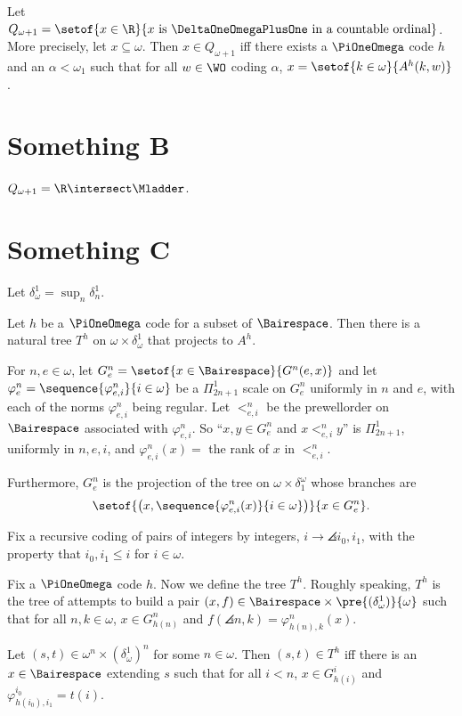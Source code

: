 \documentclass[oneside,12pt]{amsart}
\begin{document}
\begin{definition}
Let $Q_{\omega+1} = \setof{x\in\R}{x\text{ is }\DeltaOneOmegaPlusOne\text{ in a countable ordinal}}$. More precisely,
let $x\subseteq\omega$. Then $x\in Q_{\omega+1}$ iff there exists a $\PiOneOmega$ code $h$ and an $\alpha<\omega_1$ such that
for all $w\in\WO$ coding $\alpha$, $x=\setof{k\in\omega}{A^h(k,w)}$.
\end{definition}

\section{Something B}
\label{section:somethingb}
\begin{theorem}
$Q_{\omega+1} = \R \intersect \Mladder$.
\end{theorem}

\section{Something C}
\label{section:somethingac}

Let $\delta^1_{\omega} = \sup_n \delta^1_n$.

\begin{definition}
Let $h$ be a $\PiOneOmega$ code for a subset of $\Bairespace$.
Then there is a natural tree $T^{h}$ on $\omega\times\delta^1_{\omega}$ that projects to $A^h$.

For $n,e\in\omega$, let $G^n_e = \setof{x\in\Bairespace}{G^n(e, x)}$ and
let $\varphi^n_e = \sequence{\varphi^n_{e,i}}{i\in\omega}$ be a $\Pi^1_{2n+1}$ scale on $G^n_e$ uniformly in $n$ and $e$,
with each of the norms $\varphi^n_{e,i}$ being regular.
Let $<^n_{e,i}$ be the prewellorder on $\Bairespace$ associated with $\varphi^n_{e,i}$. So ``$x,y\in G^n_e$ and $x <^n_{e,i} y$'' is
$\Pi^1_{2n+1}$, uniformly in $n,e,i$, and $\varphi^n_{e,i}(x) = $ the rank of $x$ in $<^n_{e,i}$.

Furthermore, $G^n_e$ is the projection of the tree on $\omega \times \delta_1^{\omega}$ whose branches are
$$\setof{\left(x,\sequence{\varphi^n_{e,i}(x)}{i\in\omega}\right)}{x\in G^n_e}.$$

Fix a recursive coding of pairs of integers by integers, $i\to\angles{i_0,i_1}$,
with the property that $i_0,i_1\leq i$ for $i\in\omega$.

Fix a $\PiOneOmega$ code $h$. Now we define the tree $T^h$. Roughly speaking, $T^h$ is the tree of attempts to
build a pair $(x,f) \in \Bairespace \times \pre{(\delta^1_{\omega})}{\omega}$ such that for all $n,k\in\omega$, $x\in G^n_{h(n)}$
and $f(\angles{n,k}) = \varphi^n_{h(n),k}(x)$.


Let $(s,t) \in \omega^n\times(\delta^1_{\omega})^n$ for some $n\in\omega$. Then $(s,t)\in T^h$ iff there is an
$x\in\Bairespace$ extending $s$ such that for all $i<n$, $x\in G^i_{h(i)}$ and $\varphi^{i_0}_{h(i_0),i_1} = t(i)$.
\end{definition}
\end{document}
